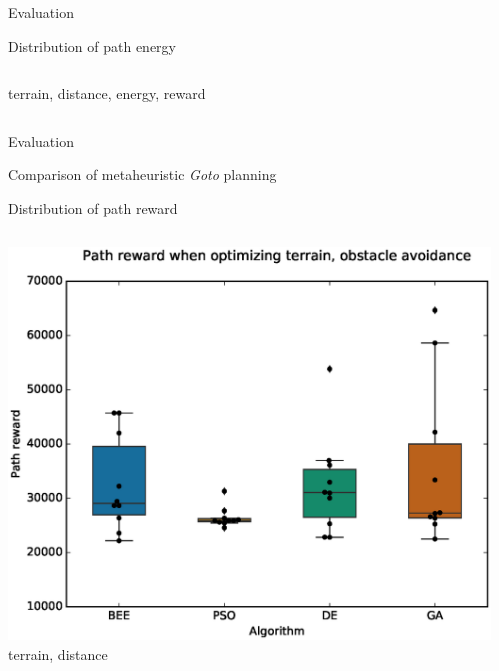 \documentclass[9pt]{beamer}
\begin{document}
\begin{frame}{Evaluation}
\begin{block}{Distribution of path energy}
\begin{columns}
\begin{column}{0.5\textwidth}
\begin{center}
                    \linebreak
                    terrain, distance, energy, reward
                \end{center}
            \end{column}
        \end{columns}
    \end{block}
\end{frame}

\begin{frame}{Evaluation}
    \begin{block}{Comparison of metaheuristic \textit{Goto} planning}
    \end{block}
    \begin{block}{Distribution of path reward}
        \begin{columns}
            \begin{column}{0.5\textwidth}
                \begin{center}
                    \includegraphics[width=\textwidth,trim={.75cm .75cm 0cm 1cm},clip]{img/EXP3_histo_reward_a.eps}
                    \linebreak
                    terrain, distance
                \end{center}
            \end{column}
            \begin{column}{0.5\textwidth}
                \begin{center}

\end{center}
\end{column}
\end{columns}
\end{block}
\end{frame}
\end{document}
